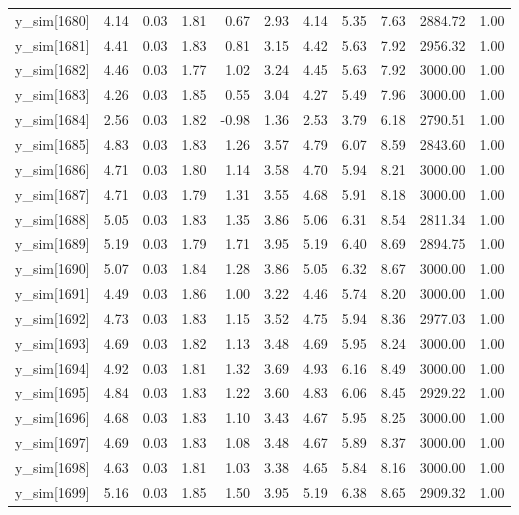 \begin{table}[ht]
\begin{tabular}{rrrrrrrrrrr}
  y\_sim[1680] & 4.14 & 0.03 & 1.81 & 0.67 & 2.93 & 4.14 & 5.35 & 7.63 & 2884.72 & 1.00 \\ 
  y\_sim[1681] & 4.41 & 0.03 & 1.83 & 0.81 & 3.15 & 4.42 & 5.63 & 7.92 & 2956.32 & 1.00 \\ 
  y\_sim[1682] & 4.46 & 0.03 & 1.77 & 1.02 & 3.24 & 4.45 & 5.63 & 7.92 & 3000.00 & 1.00 \\ 
  y\_sim[1683] & 4.26 & 0.03 & 1.85 & 0.55 & 3.04 & 4.27 & 5.49 & 7.96 & 3000.00 & 1.00 \\ 
  y\_sim[1684] & 2.56 & 0.03 & 1.82 & -0.98 & 1.36 & 2.53 & 3.79 & 6.18 & 2790.51 & 1.00 \\ 
  y\_sim[1685] & 4.83 & 0.03 & 1.83 & 1.26 & 3.57 & 4.79 & 6.07 & 8.59 & 2843.60 & 1.00 \\ 
  y\_sim[1686] & 4.71 & 0.03 & 1.80 & 1.14 & 3.58 & 4.70 & 5.94 & 8.21 & 3000.00 & 1.00 \\ 
  y\_sim[1687] & 4.71 & 0.03 & 1.79 & 1.31 & 3.55 & 4.68 & 5.91 & 8.18 & 3000.00 & 1.00 \\ 
  y\_sim[1688] & 5.05 & 0.03 & 1.83 & 1.35 & 3.86 & 5.06 & 6.31 & 8.54 & 2811.34 & 1.00 \\ 
  y\_sim[1689] & 5.19 & 0.03 & 1.79 & 1.71 & 3.95 & 5.19 & 6.40 & 8.69 & 2894.75 & 1.00 \\ 
  y\_sim[1690] & 5.07 & 0.03 & 1.84 & 1.28 & 3.86 & 5.05 & 6.32 & 8.67 & 3000.00 & 1.00 \\ 
  y\_sim[1691] & 4.49 & 0.03 & 1.86 & 1.00 & 3.22 & 4.46 & 5.74 & 8.20 & 3000.00 & 1.00 \\ 
  y\_sim[1692] & 4.73 & 0.03 & 1.83 & 1.15 & 3.52 & 4.75 & 5.94 & 8.36 & 2977.03 & 1.00 \\ 
  y\_sim[1693] & 4.69 & 0.03 & 1.82 & 1.13 & 3.48 & 4.69 & 5.95 & 8.24 & 3000.00 & 1.00 \\ 
  y\_sim[1694] & 4.92 & 0.03 & 1.81 & 1.32 & 3.69 & 4.93 & 6.16 & 8.49 & 3000.00 & 1.00 \\ 
  y\_sim[1695] & 4.84 & 0.03 & 1.83 & 1.22 & 3.60 & 4.83 & 6.06 & 8.45 & 2929.22 & 1.00 \\ 
  y\_sim[1696] & 4.68 & 0.03 & 1.83 & 1.10 & 3.43 & 4.67 & 5.95 & 8.25 & 3000.00 & 1.00 \\ 
  y\_sim[1697] & 4.69 & 0.03 & 1.83 & 1.08 & 3.48 & 4.67 & 5.89 & 8.37 & 3000.00 & 1.00 \\ 
  y\_sim[1698] & 4.63 & 0.03 & 1.81 & 1.03 & 3.38 & 4.65 & 5.84 & 8.16 & 3000.00 & 1.00 \\ 
  y\_sim[1699] & 5.16 & 0.03 & 1.85 & 1.50 & 3.95 & 5.19 & 6.38 & 8.65 & 2909.32 & 1.00 \\ 

\end{tabular}
\end{table}
